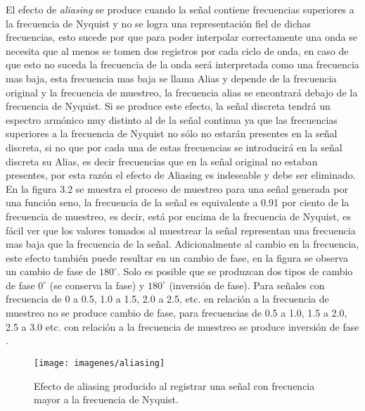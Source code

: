 El efecto de \textit{aliasing} se produce cuando la señal contiene frecuencias superiores a la frecuencia de Nyquist y no se logra una representaci\'on fiel de dichas frecuencias, esto sucede por que para poder interpolar correctamente una onda se necesita que al menos se tomen dos registros por cada ciclo de onda, en caso de que esto no suceda la frecuencia de la onda ser\'a interpretada como una frecuencia mas baja, esta frecuencia mas baja se llama Alias y depende de la frecuencia original y la frecuencia de muestreo, la frecuencia alias se encontrar\'a debajo de la frecuencia de Nyquist. Si se produce este efecto, la señal discreta tendr\'a un espectro arm\'onico muy distinto al de la señal continua ya que las frecuencias superiores a la frecuencia de Nyquist no s\'olo no estar\'an presentes en la señal discreta, si no que por cada una de estas frecuencias se introducir\'a en la señal discreta su Alias, es decir frecuencias que en la señal original no estaban presentes, por esta raz\'on el efecto de Aliasing es indeseable y debe ser eliminado.\\

En la figura 3.2 se muestra el proceso de muestreo para una señal generada por una funci\'on seno, la frecuencia de la señal es equivalente a 0.91 por ciento de la frecuencia de muestreo, es decir, est\'a por encima de la frecuencia de Nyquist, es f\'acil ver que los valores tomados al muestrear la señal representan una frecuencia mas baja que la frecuencia de la señal. Adicionalmente al cambio en la frecuencia, este efecto tambi\'en puede resultar en un cambio de fase, en la figura se observa un cambio de fase de $180^{\circ}$. Solo es posible que se produzcan dos tipos de cambio de fase $0^{\circ}$ (se conserva la fase) y $180^{\circ}$ (inversi\'on de fase). Para  señales con frecuencia de 0 a 0.5, 1.0 a 1.5, 2.0 a 2.5, etc. en relaci\'on a la frecuencia de muestreo no se produce cambio de fase, para frecuencias de 0.5 a 1.0, 1.5 a 2.0, 2.5 a 3.0 etc. con relaci\'on a la frecuencia de muestreo se produce inversi\'on de fase \cite{smith}.\\

\begin{figure}[H]
	\begin{center}
	\texttt{[image: imagenes/aliasing]} \\
	\caption{Efecto de aliasing producido al registrar una señal con frecuencia mayor a la frecuencia de Nyquist.}
	\label{fig:diag_recon_locutor}
	\end{center}
\end{figure}

